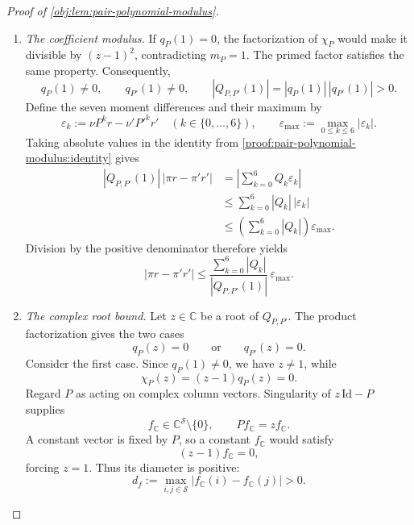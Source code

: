 \documentclass[11pt]{article}
\begin{document}
\begin{proof}[Proof of \cref{obj:lem:pair-polynomial-modulus}]
\begin{enumerate}
Induction extends this implication to
\[
D_P^nw=0\quad\Longrightarrow\quad D_Pw=0
\qquad(n\in\mathbb N,\ w\in\mathbb R^{\mathcal S}).
\]
For \(n=0\), the premise gives \(w=0\).
For the induction step,
\[
D_P^{n+1}w=0
\quad\Longrightarrow\quad
D_P^n(D_Pw)=0
\quad\Longrightarrow\quad
D_P^2w=0
\quad\Longrightarrow\quad
D_Pw=0,
\]
where the middle implication uses the induction hypothesis.

Thus the generalized eigenspace at one is
\[
\mathcal E_{P,1}
:=\bigcup_{n\in\mathbb N}\ker(D_P^n)
=\ker D_P
=\operatorname{span}_{\mathbb R}\{\mathbf1\}.
\]
Algebraic multiplicity equals the dimension of this generalized eigenspace.
Since \(\mathbf1\ne0\), it follows that
\[
m_P
:=\max\{n\in\mathbb N:(z-1)^n\text{ divides }\chi_P(z)\}
=\dim_{\mathbb R}\mathcal E_{P,1}=1.
\]
The identical argument for \(P'\) gives
\[
m_{P'}
:=\max\{n\in\mathbb N:(z-1)^n\text{ divides }\chi_{P'}(z)\}
=1.
\]

\item \emph{The coefficient modulus.}\label{proof:pair-polynomial-modulus:coefficient-modulus}
If \(q_P(1)=0\), the factorization of \(\chi_P\) would make it divisible by
\((z-1)^2\), contradicting \(m_P=1\).
The primed factor satisfies the same property. Consequently,
\[
q_P(1)\ne0,\qquad q_{P'}(1)\ne0,\qquad
|Q_{P,P'}(1)|=|q_P(1)|\,|q_{P'}(1)|>0.
\]
Define the seven moment differences and their maximum by
\[
\varepsilon_k:=\nu P^kr-\nu'P'^kr'
\quad(k\in\{0,\ldots,6\}),\qquad
\varepsilon_{\max}:=\max_{0\le k\le6}|\varepsilon_k|.
\]
Taking absolute values in the identity from \cref{proof:pair-polynomial-modulus:identity} gives
\[
\begin{aligned}
|Q_{P,P'}(1)|\,|\pi r-\pi'r'|
&=\left|\sum_{k=0}^6Q_k\varepsilon_k\right|\\
&\le\sum_{k=0}^6|Q_k|\,|\varepsilon_k|\\
&\le\left(\sum_{k=0}^6|Q_k|\right)\varepsilon_{\max}.
\end{aligned}
\]
Division by the positive denominator therefore yields
\[
|\pi r-\pi'r'|
\le
\frac{\sum_{k=0}^6|Q_k|}{|Q_{P,P'}(1)|}\,
\varepsilon_{\max}.
\]

\item \emph{The complex root bound.}
Let \(z\in\mathbb C\) be a root of \(Q_{P,P'}\).
The product factorization gives the two cases
\[
q_P(z)=0\qquad\text{or}\qquad q_{P'}(z)=0.
\]
Consider the first case.
Since \(q_P(1)\ne0\), we have \(z\ne1\), while
\[
\chi_P(z)=(z-1)q_P(z)=0.
\]
Regard \(P\) as acting on complex column vectors.
Singularity of \(z\,\mathrm{Id}-P\) supplies
\[
f_{\mathbb C}\in\mathbb C^{\mathcal S}\setminus\{0\},
\qquad Pf_{\mathbb C}=zf_{\mathbb C}.
\]
A constant vector is fixed by \(P\), so a constant \(f_{\mathbb C}\) would satisfy
\[
(z-1)f_{\mathbb C}=0,
\]
forcing \(z=1\). Thus its diameter is positive:
\[
d_f:=\max_{i,j\in\mathcal S}
|f_{\mathbb C}(i)-f_{\mathbb C}(j)|>0.
\]


\end{enumerate}
\end{proof}
\end{document}
